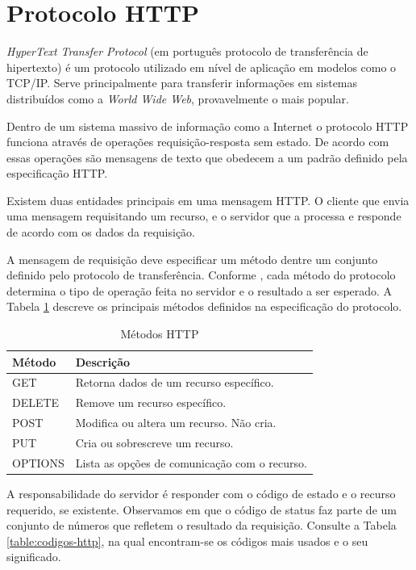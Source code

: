 \section{Protocolo HTTP}

\textit{HyperText Transfer Protocol} (em português protocolo de transferência de hipertexto) é um protocolo utilizado em nível de aplicação em modelos como o TCP/IP. Serve principalmente para transferir informações em sistemas distribuídos como a \textit{World Wide Web}, provavelmente o mais popular.

Dentro de um sistema massivo de informação como a Internet o protocolo HTTP funciona através de operações requisição-resposta sem estado. De acordo com \cite[Sec.~4]{httprfc2616} essas operações são mensagens de texto que obedecem a um padrão definido pela especificação HTTP.

Existem duas entidades principais em uma mensagem HTTP. O cliente que envia uma mensagem requisitando um recurso, e o servidor que a processa e responde de acordo com os dados da requisição.

A mensagem de requisição deve especificar um método dentre um conjunto definido pelo protocolo de transferência. Conforme \cite[Sec.~9]{httprfc2616}, cada método do protocolo determina o tipo de operação feita no servidor e o resultado a ser esperado. A Tabela \ref{table:metodos-http} descreve os principais métodos definidos na especificação do protocolo.

\begin{table}[ht!]
	\centering
	\begin{tabular}{@{}ll@{}}
		\toprule
		\textbf{Método}	     & \textbf{Descrição}       \\ \midrule
		GET		             & Retorna dados de um recurso específico.       \\
		DELETE			     & Remove um recurso específico.         \\
		POST          	  	 & Modifica ou altera um recurso. Não cria.     \\
        PUT          	  	 & Cria ou sobrescreve um recurso.     \\
		OPTIONS				 & Lista as opções de comunicação com o recurso.         \\
        \bottomrule
	\end{tabular}
	\caption{Métodos HTTP}
    \label{table:metodos-http}
\end{table}

A responsabilidade do servidor é responder com o código de estado e o recurso requerido, se existente. Observamos em \cite[Sec.~10]{httprfc2616} que o código de status faz parte de um conjunto de números que refletem o resultado da requisição. Consulte a Tabela \ref{table:codigos-http}, na qual encontram-se os códigos mais usados e o seu significado.

